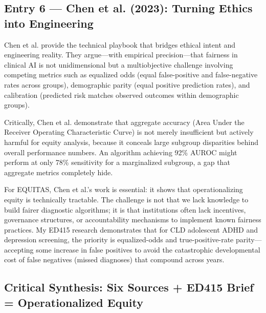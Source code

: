 \documentclass[12pt,a4paper]{article}
\begin{document}
\subsection{Entry 6 — Chen et al. (2023): Turning Ethics into Engineering}

Chen et al. provide the technical playbook that bridges ethical intent and engineering reality. They argue—with empirical precision—that fairness in clinical AI is not unidimensional but a multiobjective challenge involving competing metrics such as equalized odds (equal false-positive and false-negative rates across groups), demographic parity (equal positive prediction rates), and calibration (predicted risk matches observed outcomes within demographic groups).\cite{chen2023}

Critically, Chen et al. demonstrate that aggregate accuracy (Area Under the Receiver Operating Characteristic Curve) is not merely insufficient but actively harmful for equity analysis, because it conceals large subgroup disparities behind overall performance numbers.\cite{chen2023} An algorithm achieving 92\% AUROC might perform at only 78\% sensitivity for a marginalized subgroup, a gap that aggregate metrics completely hide.\cite{chen2023}

For EQUITAS, Chen et al.'s work is essential: it shows that operationalizing equity is technically tractable. The challenge is not that we lack knowledge to build fairer diagnostic algorithms; it is that institutions often lack incentives, governance structures, or accountability mechanisms to implement known fairness practices.\cite{chen2023} My ED415 research demonstrates that for CLD adolescent ADHD and depression screening, the priority is equalized-odds and true-positive-rate parity—accepting some increase in false positives to avoid the catastrophic developmental cost of false negatives (missed diagnoses) that compound across years.\cite{garcia_ed415}

\subsection{Critical Synthesis: Six Sources + ED415 Brief = Operationalized Equity}
\end{document}

